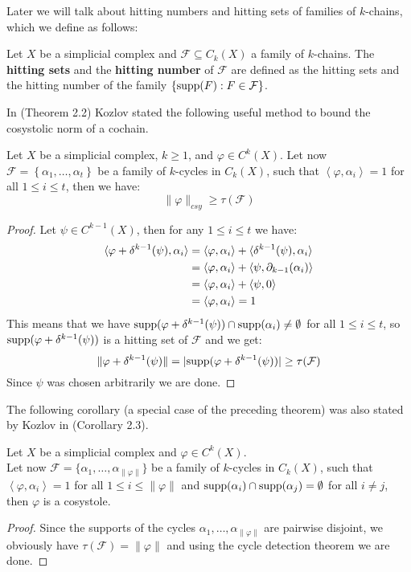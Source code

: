 Later we will talk about hitting numbers and hitting sets of families of \(k\)-chains, which we define as follows:

\begin{defi}
Let \(X\) be a simplicial complex and \(\mathcal{F}\subseteq C_k(X)\) a family of \(k\)-chains. The \textbf{hitting sets} and the \textbf{hitting number} of \(\mathcal{F}\) are defined as the hitting sets and the hitting number of the family \(\left\{\mathrm{supp}(F):F\in\mathcal{F}\right\}\).
\end{defi}

In \cite{6} (Theorem 2.2) Kozlov stated the following useful method to bound the cosystolic norm of a cochain.

\begin{thm}\label{theorem9}
Let \(X\) be a simplicial complex, \(k\geq 1\), and \(\varphi\in C^k(X)\). Let now \(\mathcal{F}=\left\{\alpha_1,\ldots,\alpha_t\right\}\) be a family of \(k\)-cycles in \(C_k(X)\), such that \(\left\langle\varphi,\alpha_i\right\rangle=1\) for all \(1\leq i\leq t\), then we have:
\[
\|\varphi\|_{csy}\geq\tau(\mathcal{F})
\]
\begin{proof}
Let \(\psi\in C^{k-1}(X)\), then for any \(1\leq i\leq t\) we have:
\begin{align}
\langle\varphi+\delta^{k-1}(\psi),\alpha_i\rangle&=\langle\varphi,\alpha_i\rangle+\langle\delta^{k-1}(\psi),\alpha_i\rangle\notag\\
&=\langle\varphi,\alpha_i\rangle+\langle\psi,\partial_{k-1}(\alpha_i)\rangle\notag\\
&=\langle\varphi,\alpha_i\rangle+\langle\psi,0\rangle\notag\\
&=\langle\varphi,\alpha_i\rangle=1\notag
\end{align}
This means that we have \(\mathrm{supp}(\varphi+\delta^{k-1}(\psi))\cap \mathrm{supp}(\alpha_i)\neq\emptyset\) for all \(1\leq i\leq t\), so \(\mathrm{supp}(\varphi+\delta^{k-1}(\psi))\) is a hitting set of \(\mathcal{F}\) and we get:
\[
\|\varphi+\delta^{k-1}(\psi)\|=|\mathrm{supp}(\varphi+\delta^{k-1}(\psi))|\geq\tau(\mathcal{F})
\]
Since \(\psi\) was chosen arbitrarily we are done.
\end{proof}
\end{thm}

The following corollary (a special case of the preceding theorem) was also stated by Kozlov in \cite{6} (Corollary 2.3).

\begin{cor}\label{corollary1}
Let \(X\) be a simplicial complex and \(\varphi\in C^k(X)\).\\
Let now \(\mathcal{F}=\{\alpha_1,\ldots,\alpha_{\|\varphi\|}\}\) be a family of \(k\)-cycles in \(C_k(X)\), such that \(\left\langle\varphi,\alpha_i\right\rangle=1\) for all \(1\leq i\leq\|\varphi\|\) and \(\mathrm{supp}(\alpha_i)\cap \mathrm{supp}(\alpha_j)=\emptyset\) for all \(i\neq j\), then \(\varphi\) is a cosystole.
\begin{proof}
Since the supports of the cycles \(\alpha_1,\ldots,\alpha_{\|\varphi\|}\) are pairwise disjoint, we obviously have \(\tau(\mathcal{F})=\|\varphi\|\) and using the cycle detection theorem we are done.
\end{proof}
\end{cor}

